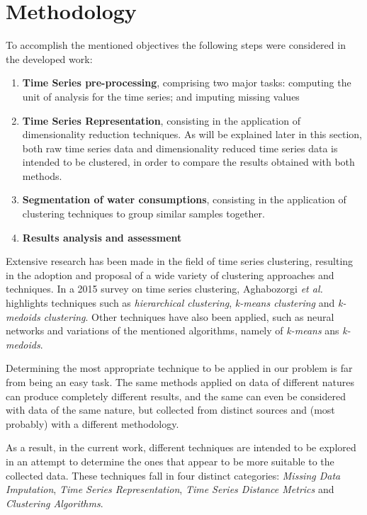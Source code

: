 \documentclass[9pt,journal,compsoc]{IEEEtran}
\begin{document}
\section{Methodology}
\label{methodology}

To accomplish the mentioned objectives the following steps were considered in the developed work:

\begin{enumerate}
	\item \textbf{Time Series pre-processing}, comprising two major tasks: computing the unit of analysis for the time series; and imputing missing values
	
	\item \textbf{Time Series Representation}, consisting in the application of dimensionality reduction techniques. As will be explained later in this section, both raw time series data and dimensionality reduced time series data is intended to be clustered, in order to compare the results obtained with both methods.
	
	\item \textbf{Segmentation of water consumptions}, consisting in the application of clustering techniques to group similar samples together.
	
	\item \textbf{Results analysis and assessment}
\end{enumerate}

Extensive research has been made in the field of time series clustering, resulting in the adoption and proposal of a wide variety of clustering approaches and techniques. In a 2015 survey on time series clustering, Aghabozorgi \emph{et al.} \cite{aghabozorgi2015time} highlights techniques such as \emph{hierarchical clustering}, \emph{k-means clustering} and \emph{k-medoids clustering}. Other techniques have also been applied, such as neural networks and variations of the mentioned algorithms, namely of \emph{k-means} ans \emph{k-medoids}.

Determining the most appropriate technique to be applied in our problem is far from being an easy task. The same methods applied on data of different natures can produce completely different results, and the same can even be considered with data of the same nature, but collected from distinct sources and (most probably) with a different methodology.

As a result, in the current work, different techniques are intended to be explored in an attempt to determine the ones that appear to be more suitable to the collected data. These techniques fall in four distinct categories: \emph{Missing Data Imputation}, \emph{Time Series Representation}, \emph{Time Series Distance Metrics} and \emph{Clustering Algorithms}.
 
\end{document}
